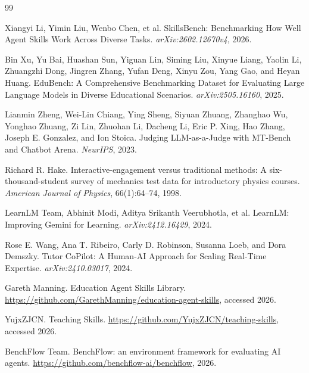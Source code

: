 \documentclass[10pt]{article}
\begin{document}
\begin{thebibliography}{99}

Xiangyi Li, Yimin Liu, Wenbo Chen, et al.
\newblock SkillsBench: Benchmarking How Well Agent Skills Work Across Diverse Tasks.
\newblock \emph{arXiv:2602.12670v4}, 2026.

Bin Xu, Yu Bai, Huashan Sun, Yiguan Lin, Siming Liu, Xinyue Liang, Yaolin Li, Zhuangzhi Dong, Jingren Zhang, Yufan Deng, Xinyu Zou, Yang Gao, and Heyan Huang.
\newblock EduBench: A Comprehensive Benchmarking Dataset for Evaluating Large Language Models in Diverse Educational Scenarios.
\newblock \emph{arXiv:2505.16160}, 2025.

Lianmin Zheng, Wei-Lin Chiang, Ying Sheng, Siyuan Zhuang, Zhanghao Wu, Yonghao Zhuang, Zi Lin, Zhuohan Li, Dacheng Li, Eric P. Xing, Hao Zhang, Joseph E. Gonzalez, and Ion Stoica.
\newblock Judging LLM-as-a-Judge with MT-Bench and Chatbot Arena.
\newblock \emph{NeurIPS}, 2023.

Richard R. Hake.
\newblock Interactive-engagement versus traditional methods: A six-thousand-student survey of mechanics test data for introductory physics courses.
\newblock \emph{American Journal of Physics}, 66(1):64--74, 1998.

LearnLM Team, Abhinit Modi, Aditya Srikanth Veerubhotla, et al.
\newblock LearnLM: Improving Gemini for Learning.
\newblock \emph{arXiv:2412.16429}, 2024.

Rose E. Wang, Ana T. Ribeiro, Carly D. Robinson, Susanna Loeb, and Dora Demszky.
\newblock Tutor CoPilot: A Human-AI Approach for Scaling Real-Time Expertise.
\newblock \emph{arXiv:2410.03017}, 2024.

Gareth Manning.
\newblock Education Agent Skills Library.
\newblock \url{https://github.com/GarethManning/education-agent-skills}, accessed 2026.

YujxZJCN.
\newblock Teaching Skills.
\newblock \url{https://github.com/YujxZJCN/teaching-skills}, accessed 2026.

BenchFlow Team.
\newblock BenchFlow: an environment framework for evaluating AI agents.
\newblock \url{https://github.com/benchflow-ai/benchflow}, 2026.

\end{thebibliography}
\end{document}

